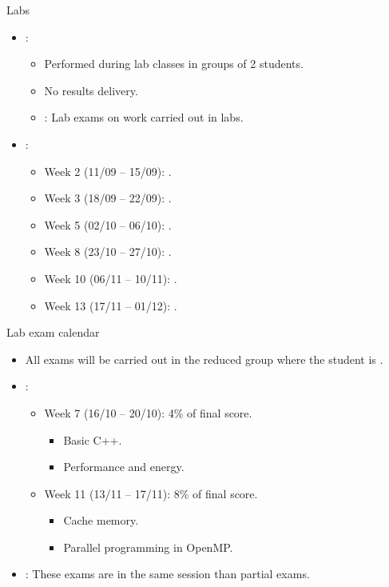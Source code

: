 \begin{frame}[t]{Labs}
\begin{itemize}
  \item {}:
    \begin{itemize}
        \item Performed during lab classes in groups of 2 students.
        \item No results delivery.
        \item {}: Lab exams on work carried out in labs.
    \end{itemize}

  \item {}:
    \begin{itemize}
      \item Week 2 (11/09 -- 15/09): .
      \item Week 3 (18/09 -- 22/09): .
      \item Week 5 (02/10 -- 06/10): .
      \item Week 8 (23/10 -- 27/10): .
      \item Week 10 (06/11 -- 10/11): .
      \item Week 13 (17/11 -- 01/12): .
    \end{itemize}
\end{itemize}
\end{frame}

\begin{frame}[t]{Lab exam calendar}
\begin{itemize}
  \item All exams will be carried out in the reduced group
        where the student is .

  \vfill
  \item {}:
  \begin{itemize}
    \item Week 7 (16/10 -- 20/10): 4\% of final score.
      \begin{itemize}
        \item Basic C++.
        \item Performance and energy.
      \end{itemize}
    \item Week 11 (13/11 -- 17/11): 8\% of final score.
      \begin{itemize}
        \item Cache memory.
        \item Parallel programming in OpenMP.
      \end{itemize}
  \end{itemize}

  \item {}: These exams are in the same session
        than partial exams.
\end{itemize}
\end{frame}

